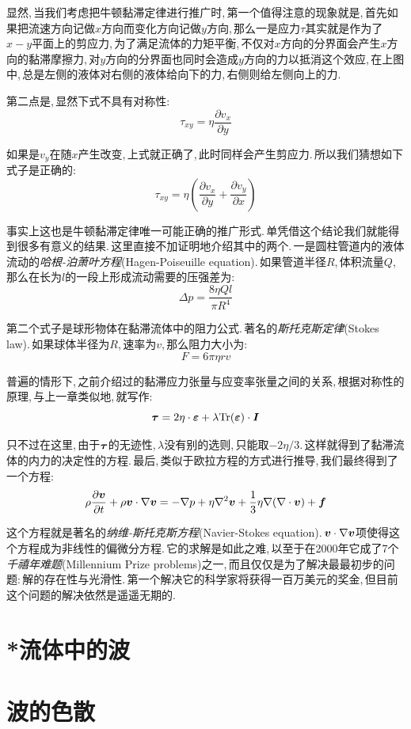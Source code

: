 显然,\,当我们考虑把牛顿黏滞定律进行推广时,\,第一个值得注意的现象就是,\,首先如果把流速方向记做$x$方向而变化方向记做$y$方向,\,那么一是应力$\tau$其实就是作为了$x-y$平面上的剪应力,\,为了满足流体的力矩平衡,\,不仅对$x$方向的分界面会产生$x$方向的黏滞摩擦力,\,对$y$方向的分界面也同时会造成$y$方向的力以抵消这个效应,\,在上图中,\,总是左侧的液体对右侧的液体给向下的力,\,右侧则给左侧向上的力.

第二点是,\,显然下式不具有对称性:
\[\tau_{xy}=\eta\frac{\partial v_x}{\partial y}\]

如果是$v_y$在随$x$产生改变,\,上式就正确了,\,此时同样会产生剪应力.\,所以我们猜想如下式子是正确的:
\[\tau_{xy}=\eta\left(\frac{\partial v_x}{\partial y}+\frac{\partial v_y}{\partial x}\right)\]

事实上这也是牛顿黏滞定律唯一可能正确的推广形式.\,单凭借这个结论我们就能得到很多有意义的结果.\,这里直接不加证明地介绍其中的两个.\,一是圆柱管道内的液体流动的\emph{哈根-泊萧叶方程}(Hagen-Poiseuille equation).\,如果管道半径$R$,\,体积流量$Q$,\,那么在长为$l$的一段上形成流动需要的压强差为:
\[\Delta p=\frac{8\eta Ql}{\pi R^4}\]

第二个式子是球形物体在黏滞流体中的阻力公式.\,著名的\emph{斯托克斯定律}(Stokes law).\,如果球体半径为$R$,\,速率为$v$,\,那么阻力大小为:
\[F=6\pi\eta rv\]

普遍的情形下,\,之前介绍过的黏滞应力张量与应变率张量之间的关系,\,根据对称性的原理,\,与上一章类似地,\,就写作:
\[\boldsymbol{\tau}=2\eta\cdot \boldsymbol{\varepsilon}+\lambda {\rm Tr}(\boldsymbol{\varepsilon})\cdot \boldsymbol{I}\]

只不过在这里,\,由于$\boldsymbol{\tau}$的无迹性,\,$\lambda$没有别的选则,\,只能取$-2\eta/3$.\,这样就得到了黏滞流体的内力的决定性的方程.\,最后,\,类似于欧拉方程的方式进行推导,\,我们最终得到了一个方程:
\[\rho\frac{\partial \boldsymbol{v}}{\partial t}+\rho\boldsymbol{v}\cdot\nabla\boldsymbol{v}=-\nabla p+\eta\nabla^2\boldsymbol{v}+\frac{1}{3}\eta\nabla(\nabla\cdot\boldsymbol{v})+\boldsymbol{f}\]

这个方程就是著名的\emph{纳维-斯托克斯方程}(Navier-Stokes equation).\,$\boldsymbol{v}\cdot\nabla\boldsymbol{v}$项使得这个方程成为非线性的偏微分方程.\,它的求解是如此之难,\,以至于在2000年它成了7个\emph{千禧年难题}(Millennium Prize problems)之一,\,而且仅仅是为了解决最最初步的问题:\,解的存在性与光滑性.\,第一个解决它的科学家将获得一百万美元的奖金,\,但目前这个问题的解决依然是遥遥无期的.




\section{*流体中的波}

\section{波的色散}